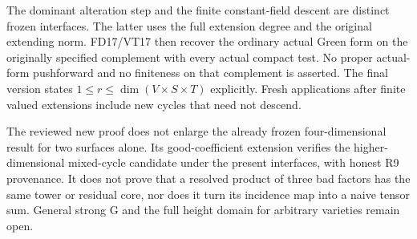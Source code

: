 The dominant alteration step and the finite constant-field descent
are distinct frozen interfaces. The latter uses the full extension
degree and the original extending norm. FD17/VT17 then recover the
ordinary actual Green form on the originally specified complement
with every actual compact test. No proper actual-form pushforward
and no finiteness on that complement is asserted. The final version
states $1\le r\le\dim(V\times S\times T)$ explicitly. Fresh
applications after finite valued extensions include new cycles that
need not descend.

The reviewed new proof does not enlarge the already frozen
four-dimensional result for two surfaces alone. Its good-coefficient
extension verifies the higher-dimensional mixed-cycle candidate
under the present interfaces, with honest R9 provenance. It does
not prove that a resolved product of three bad factors has the
same tower or residual core, nor does it turn its incidence map
into a naive tensor sum. General strong G and the full height
domain for arbitrary varieties remain open.
